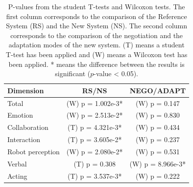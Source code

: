 \documentclass[english,a4paper,11pt,twoside]{StyleThese}
\begin{document}
\begin{table}[h]
 \centering\label{tab:Wilcoxon}
  \begin{tabular}{|l|c|c|} \hline
   \textbf{Dimension} & \textbf{RS/NS} & \textbf{NEGO/ADAPT} \\\hline
   Total & (W) p = 1.002e-3* & (W) p = 0.147 \\\hline
   Emotion & (W) p = 2.513e-2* & (W) p = 0.830\\\hline
   Collaboration & (T) p = 4.321e-3* &  (W) p = 0.434\\\hline
   Interaction & (T) p = 3.605e-2* & (W) p = 0.237  \\\hline
   Robot perception & (W) p = 2.080e-2* & (W) p = 0.531 \\\hline
   Verbal & (T) p = 0.308 & (W) p = 8.966e-3* \\\hline
   Acting & (T) p = 3.537e-3* & (W) p = 0.222 \\\hline
  \end{tabular}
  \caption{P-values from the student T-tests and Wilcoxon tests. The first column corresponds to the comparison of the Reference System (RS) and the New System (NS). The second column corresponds to the comparison of the negotiation and the adaptation modes of the new system. (T) means a student T-test has been applied and (W) means a Wilcoxon test has been applied. * means the difference between the results is significant ($p$-value < 0.05).}
\end{table}
\end{document}
